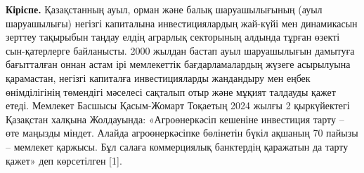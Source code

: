 {{{\bfseries Кіріспе.} Қазақстанның ауыл, орман және балық шаруашылығының
(ауыл шаруашылығы) негізгі капиталына инвестициялардың жай-күйі мен
динамикасын зерттеу тақырыбын таңдау елдің аграрлық секторының алдында
тұрған өзекті сын-қатерлерге байланысты. 2000 жылдан бастап ауыл
шаруашылығын дамытуға бағытталған оннан астам ірі мемлекеттік
бағдарламалардың жүзеге асырылуына қарамастан, негізгі капиталға
инвестицияларды жандандыру мен еңбек өнімділігінің төмендігі мәселесі
сақталып отыр және мұқият талдауды қажет етеді. Мемлекет Басшысы
Қасым-Жомарт Тоқаетың 2024 жылғы 2 қыркүйектегі Қазақстан халқына
Жолдауында: «Агроөнеркәсіп кешеніне инвестиция тарту -- өте маңызды
міндет. Алайда агроөнеркәсіпке бөлінетін бүкіл ақшаның 70 пайызы --
мемлекет қаржысы. Бұл салаға коммерциялық банктердің қаражатын да тарту
қажет» деп көрсетілген {[}1{]}.

}}
